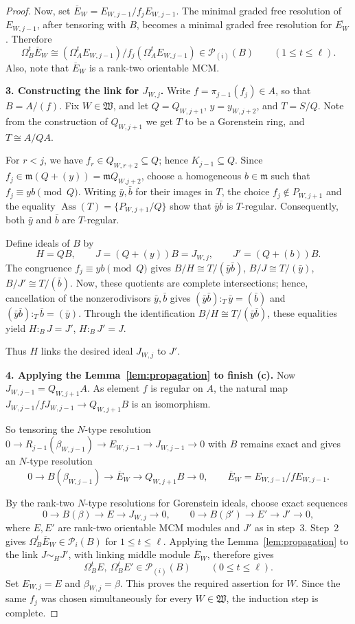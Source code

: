\documentclass[11pt,letterpaper]{amsart}
\newcommand{\x}{\xrightarrow{}}
\theoremstyle{plain}
\theoremstyle{definition}
\theoremstyle{remark}
\begin{document}
\begin{proof}
Now, set \(\overline E_W=E_{W,j-1}/f_jE_{W,j-1}\).
The minimal graded free resolution of \(E_{W,j-1}\), after tensoring with $B$, becomes a minimal graded free resolution for $\overline{E_W}$. Therefore
\[
 \Omega_B^t\overline E_W
 \cong(\Omega_A^tE_{W,j-1})/f_j(\Omega_A^tE_{W,j-1})
 \in\mathcal{P}_{(i)}(B)\qquad(1\leq t\leq\ell).
\]
Also, note that \(\overline E_W\) is a rank-two orientable MCM.

\smallskip\noindent\textbf{3. Constructing the link for $J_{W,j}$.}
Write $f=\pi_{j-1}(f_j)\in A$, so that $B=A/(f)$.
Fix $W\in\mathfrak W$, and let $Q=Q_{W,j+1}$, $y=y_{W,j+2}$, and $T=S/Q$. Note from the construction of $Q_{W,j+1}$ we get $T$ to be a Gorenstein ring, and $T\cong A/QA$. 

For $r<j$, we have $f_r\in Q_{W,r+2}\subseteq Q$; hence $K_{j-1}\subseteq Q$. Since $f_j\in\mathfrak m(Q+(y))=\mathfrak mQ_{W.j+2}$, choose a homogeneous $b\in\mathfrak m$ such that $f_j\equiv yb\pmod Q$.
Writing $\bar y,\bar b$ for their images in $T$, the choice $f_j\notin P_{W,j+1}$ and the equality $\operatorname{Ass}(T)=\{P_{W,j+1}/Q\}$ show that $\bar y\bar b$ is $T$-regular.
Consequently, both $\bar y$ and $\bar b$ are $T$-regular.

Define ideals of $B$ by
\[
H=QB,\qquad J=(Q+(y))B=J_{W,j},\qquad J'=(Q+(b))B.
\]
The congruence $f_j\equiv yb\pmod Q$ gives $B/H\cong T/(\bar y\bar b)$, $B/J\cong T/(\bar y)$, $B/J'\cong T/(\bar b)$.
Now, these quotients are complete intersections; hence, cancellation of the nonzerodivisors $\bar y,\bar b$ gives $(\bar y\bar b):_T\bar y=(\bar b)$ and $(\bar y\bar b):_T\bar b=(\bar y)$.
Through the identification $B/H\cong T/(\bar y\bar b)$, these equalities yield $H:_B J=J'$, $H:_B J'=J$.

Thus $H$ links the desired ideal $J_{W,j}$ to $J'$.

\smallskip\noindent\textbf{4. Applying the Lemma~\ref{lem:propagation} to finish (c).}
Now $J_{W,j-1}=Q_{W,j+1}A$.
As element $f$ is regular on $A$, the natural map $J_{W,j-1}/fJ_{W,j-1}\x Q_{W,j+1}B$ is an isomorphism.

So tensoring the $N$-type resolution $0\x R_{j-1}(\beta_{W,j-1})\x E_{W,j-1}\x J_{W,j-1}\x0$ with $B$ remains exact and gives an $N$-type resolution
\[
0\longrightarrow B(\beta_{W,j-1})
\longrightarrow \overline E_W
\longrightarrow Q_{W,j+1}B
\longrightarrow0,
\qquad
\overline E_W=E_{W,j-1}/fE_{W,j-1}.
\]

By the rank-two $N$-type resolutions for Gorenstein ideals, choose exact sequences
\[
0\longrightarrow B(\beta)\longrightarrow E\longrightarrow J_{W,j}\longrightarrow0,
\qquad
0\longrightarrow B(\beta')\longrightarrow E'\longrightarrow J'\longrightarrow0,
\]
where $E,E'$ are rank-two orientable MCM modules and $J'$ as in step~3.
Step~2 gives $\Omega_B^t\overline E_W\in\mathcal P_{i}(B)$ for $1\le t\le\ell$.
Applying the Lemma~\ref{lem:propagation} to the link $J\sim_H J'$, with linking middle module $\overline E_W$, therefore gives
\[
\Omega_B^tE,\ \Omega_B^tE'\in\mathcal P_{(i)}(B)
\qquad(0\le t\le\ell).
\]
Set $E_{W,j}=E$ and $\beta_{W,j}=\beta$. 
This proves the required assertion for $W$.
Since the same $f_j$ was chosen simultaneously for every $W\in\mathfrak W$, the induction step is complete.


\end{proof}
\end{document}
